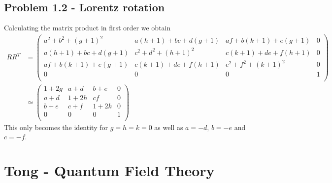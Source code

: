 \documentclass[../main.tex]{subfiles}
\begin{document}
\subsection{Problem 1.2 - Lorentz rotation}
Calculating the matrix product in first order we obtain
\begin{align}
R R^T&=\left(
\begin{array}{cccc}
 a^2+b^2+(g+1)^2 & a (h+1)+b c+d (g+1) & a f+b (k+1)+e (g+1) & 0 \\
 a (h+1)+b c+d (g+1) & c^2+d^2+(h+1)^2 & c (k+1)+d e+f (h+1) & 0 \\
 a f+b (k+1)+e (g+1) & c (k+1)+d e+f (h+1) & e^2+f^2+(k+1)^2 & 0 \\
 0 & 0 & 0 & 1 \\
\end{array}
\right)\\
&\simeq
\left(
\begin{array}{cccc}
 1+2g & a+d & b+e & 0 \\
 a+d & 1+2h & cf & 0 \\
 b+e & c+f & 1+2k & 0 \\
 0 & 0 & 0 & 1 \\
\end{array}
\right)
\end{align}
This only becomes the identity for $g=h=k=0$ as well as $a=-d$, $b=-e$ and $c=-f$.

\newpage
\section{{\sc Tong} - Quantum Field Theory}
\end{document}
